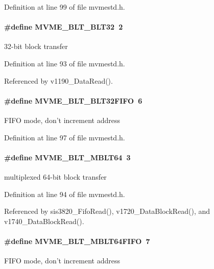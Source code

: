 Definition at line 99 of file mvmestd.h.
\paragraph[{MVME\_\-BLT\_\-BLT32}]{\setlength{\rightskip}{0pt plus 5cm}\#define MVME\_\-BLT\_\-BLT32~2}\hfill\label{group__mvmestdinclude_ga27ecf7af5c7788bc6e59ad1084112759}
32-\/bit block transfer 

Definition at line 93 of file mvmestd.h.

Referenced by v1190\_\-DataRead().
\paragraph[{MVME\_\-BLT\_\-BLT32FIFO}]{\setlength{\rightskip}{0pt plus 5cm}\#define MVME\_\-BLT\_\-BLT32FIFO~6}\hfill\label{group__mvmestdinclude_ga8555fba49268cce0bc9daf90c3c052ff}
FIFO mode, don't increment address 

Definition at line 97 of file mvmestd.h.
\paragraph[{MVME\_\-BLT\_\-MBLT64}]{\setlength{\rightskip}{0pt plus 5cm}\#define MVME\_\-BLT\_\-MBLT64~3}\hfill\label{group__mvmestdinclude_ga29f0f94e8421c77f5bd0da963fbab2ab}
multiplexed 64-\/bit block transfer 

Definition at line 94 of file mvmestd.h.

Referenced by sis3820\_\-FifoRead(), v1720\_\-DataBlockRead(), and v1740\_\-DataBlockRead().
\paragraph[{MVME\_\-BLT\_\-MBLT64FIFO}]{\setlength{\rightskip}{0pt plus 5cm}\#define MVME\_\-BLT\_\-MBLT64FIFO~7}\hfill\label{group__mvmestdinclude_gaab423ba16ad8c2f328862e7090cea712}
FIFO mode, don't increment address 

